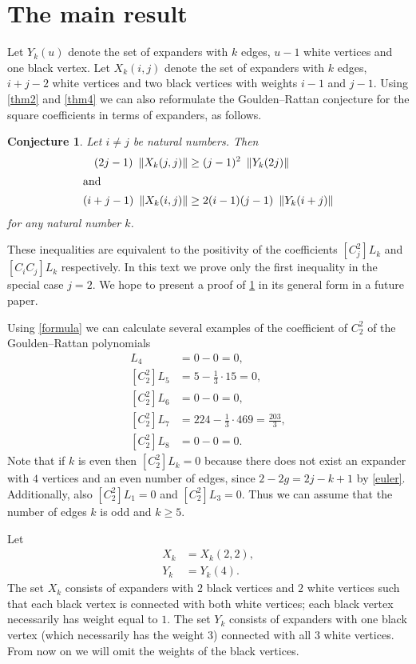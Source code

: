 \documentclass[submission]{FPSAC2021}
\newtheorem{con}{Conjecture}
\begin{document}
\section{The main result} 

Let $Y_k(u)$ denote the set of expanders 
with $k$ edges, $u-1$ white vertices and 
one black vertex. Let $X_k(i, j)$ denote 
the set of expanders with $k$ edges, 
$i+j-2$ white vertices and two black 
vertices with weights $i-1$ and $j-1$. 
Using  \cref{thm2} and \cref{thm4} we can 
also reformulate the Goulden--Rattan 
conjecture for the square coefficients 
in terms of expanders, as follows.
\begin{con} 
    \label{con:GJ2}
Let $i \neq j$ be natural numbers. Then 
\begin{align*}
(2j-1)\ \left\| X_k(j, j) \right\|    &   \geq (j-1)^2\ \left\| Y_k(2j) \right\| \\
\intertext{and}
(i+j-1)\ \left\| X_k(i, j) \right\|  & \geq 2(i-1)(j-1)\ \left\| Y_k(i+j) \right\|
\end{align*}
for any natural number $k$. 
\end{con}
These inequalities are equivalent to the 
positivity of the coefficients $[C_j^2] L_k$ 
and $[C_i C_j] L_k$ respectively. 
In this text we prove only the first 
inequality  in the special case 
$j=2$. We hope to present
a proof of \cref{con:GJ2} in its general 
form in a future paper.

Using \cref{formula} 
we can calculate several examples of 
the coefficient of $C_2^2$ of 
the Goulden--Rattan polynomials
\begin{align*}
[C_2^2] L_4 &=0-0=0,\\
[C_2^2] L_5 &=5-\frac{1}{3} \cdot 15=0,\\
[C_2^2] L_6 &=0-0=0, \\
[C_2^2] L_7 &=224-\frac{1}{3} \cdot 469=\frac{203}{3}, \\
[C_2^2] L_8 &=0-0=0. 
\end{align*}
Note that if $k$ is even then $[C_2^2] L_k=0$ because there does not exist an expander with $4$ vertices and an even number of edges, since
$2-2g=2j-k+1$ by \cref{euler}. Additionally, also $[C_2^2]L_1=0$ and $[C_2^2]L_3=0$. Thus we can assume that the number of edges $k$ is odd and $k \geq 5$. 

Let 
\begin{align}
\label{xdef}
X_k &= X_k(2, 2), \\
\label{ydef}
Y_k &= Y_k(4).
\end{align}
The set $X_k$ consists of expanders with 
$2$ black vertices and $2$ white vertices
such that each black vertex is connected 
with both white vertices;
each black vertex necessarily has weight 
equal to $1$. The set $Y_k$ consists of 
expanders with one black vertex 
(which necessarily has the weight $3$) 
connected with all $3$ white vertices. 
From now on we will omit the weights 
of the black vertices.
\end{document}
